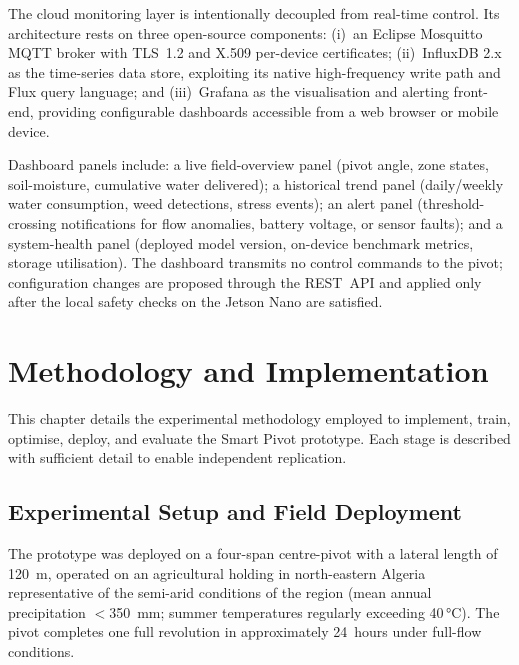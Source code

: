 \documentclass[12pt,a4paper]{report}
\begin{document}
The cloud monitoring layer is intentionally decoupled from real-time control. Its architecture rests on three open-source components: (i)~an Eclipse Mosquitto MQTT broker with TLS~1.2 and X.509 per-device certificates; (ii)~InfluxDB 2.x as the time-series data store, exploiting its native high-frequency write path and Flux query language; and (iii)~Grafana as the visualisation and alerting front-end, providing configurable dashboards accessible from a web browser or mobile device.

Dashboard panels include: a live field-overview panel (pivot angle, zone states, soil-moisture, cumulative water delivered); a historical trend panel (daily/weekly water consumption, weed detections, stress events); an alert panel (threshold-crossing notifications for flow anomalies, battery voltage, or sensor faults); and a system-health panel (deployed model version, on-device benchmark metrics, storage utilisation). The dashboard transmits no control commands to the pivot; configuration changes are proposed through the REST~API and applied only after the local safety checks on the Jetson Nano are satisfied.

\chapter{Methodology and Implementation}
\label{ch:method}
\pagestyle{fancy}
\thispagestyle{empty}

This chapter details the experimental methodology employed to implement, train, optimise, deploy, and evaluate the Smart Pivot prototype. Each stage is described with sufficient detail to enable independent replication.

\section{Experimental Setup and Field Deployment}

The prototype was deployed on a four-span centre-pivot with a lateral length of 120~m, operated on an agricultural holding in north-eastern Algeria representative of the semi-arid conditions of the region (mean annual precipitation $<$350~mm; summer temperatures regularly exceeding 40\,°C). The pivot completes one full revolution in approximately 24~hours under full-flow conditions.
\end{document}
